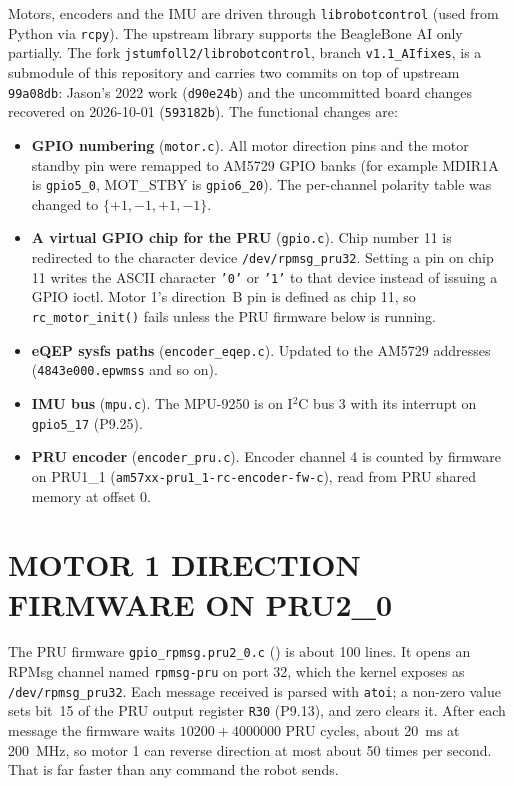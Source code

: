 Motors, encoders and the IMU are driven through \texttt{librobotcontrol}
(used from Python via \texttt{rcpy}). The upstream library supports the
BeagleBone AI only partially. The fork
\texttt{jstumfoll2/librobotcontrol}, branch \texttt{v1.1\_AIfixes}, is a
submodule of this repository and carries two commits on top of upstream
\texttt{99a08db}: Jason's 2022 work (\texttt{d90e24b}) and the uncommitted
board changes recovered on 2026-10-01 (\texttt{593182b}). The functional
changes are:
\begin{itemize}
\item \textbf{GPIO numbering} (\texttt{motor.c}). All motor direction pins and
  the motor standby pin were remapped to AM5729 GPIO banks (for example MDIR1A
  is \texttt{gpio5\_0}, MOT\_STBY is \texttt{gpio6\_20}). The per-channel
  polarity table was changed to $\{+1,-1,+1,-1\}$.
\item \textbf{A virtual GPIO chip for the PRU} (\texttt{gpio.c}). Chip number
  11 is redirected to the character device \texttt{/dev/rpmsg\_pru32}. Setting
  a pin on chip 11 writes the ASCII character \texttt{'0'} or \texttt{'1'} to
  that device instead of issuing a GPIO ioctl. Motor 1's direction~B pin is
  defined as chip 11, so \texttt{rc\_motor\_init()} fails unless the PRU
  firmware below is running.
\item \textbf{eQEP sysfs paths} (\texttt{encoder\_eqep.c}). Updated to the
  AM5729 addresses (\texttt{4843e000.epwmss} and so on).
\item \textbf{IMU bus} (\texttt{mpu.c}). The MPU-9250 is on I$^2$C bus 3 with
  its interrupt on \texttt{gpio5\_17} (P9.25).
\item \textbf{PRU encoder} (\texttt{encoder\_pru.c}). Encoder channel 4 is
  counted by firmware on PRU1\_1 (\texttt{am57xx-pru1\_1-rc-encoder-fw-c}),
  read from PRU shared memory at offset 0.
\end{itemize}

\section{MOTOR 1 DIRECTION FIRMWARE ON PRU2\_0}
\label{sec:pru}

The PRU firmware \texttt{gpio\_rpmsg.pru2\_0.c}
() is about 100 lines. It opens
an RPMsg channel named \texttt{rpmsg-pru} on port 32, which the kernel exposes
as \texttt{/dev/rpmsg\_pru32}. Each message received is parsed with
\texttt{atoi}; a non-zero value sets bit~15 of the PRU output register
\texttt{R30} (P9.13), and zero clears it. After each message the firmware
waits $\num{10200}+\num{4000000}$ PRU cycles, about \SI{20}{ms} at
\SI{200}{MHz}, so motor 1 can reverse direction at most about 50 times per
second. That is far faster than any command the robot sends.

